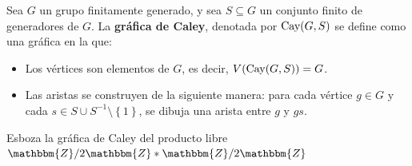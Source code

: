 \documentclass[12pt]{report}
\newcounter{it}
\theoremstyle{largebreak}
\newcommand{\bbm}[1]{\ensuremath{\mathbbm{#1}}}
\begin{document}
    \begin{mydef}
        Sea $G$ un grupo finitamente generado, y sea $S\subseteq G$ un conjunto finito de generadores de $G$. La \textbf{gráfica de Caley}, denotada por $\textup{Cay}(G,S)$ se define como una gráfica en la que:
        \begin{itemize}
            \item Los vértices son elementos de $G$, es decir, $V(\textup{Cay}(G,S))=G$.
            \item Las aristas se construyen de la siguiente manera: para cada vértice $g\in G$ y cada $s\in S\cup S^{-1}\setminus\left\{1\right\}$, se dibuja una arista entre $g$ y $gs$.
        \end{itemize}
    \end{mydef}

    \begin{excer}
        Esboza la gráfica de Caley del producto libre $\bbm{Z}/2\bbm{Z}*\bbm{Z}/2\bbm{Z}$
    \end{excer}
\end{document}

